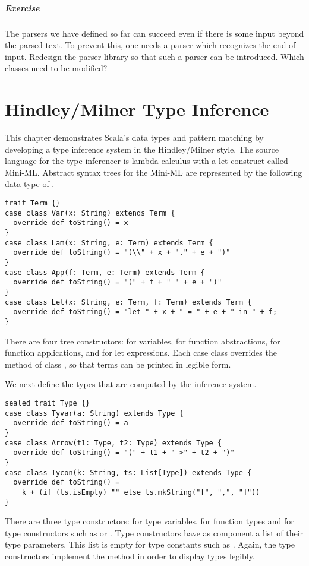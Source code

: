 \documentclass[a4paper,12pt,twoside,titlepage]{book}
\newcommand{\exercise}{\paragraph{Exercise}}
\begin{document}
{\exercise\label{exercise:end-marker} The parsers we have defined so
far can succeed even if there is some input beyond the parsed text. To
prevent this, one needs a parser which recognizes the end of input.
Redesign the parser library so that such a parser can be introduced.
Which classes need to be modified?

\chapter{\label{sec:hm}Hindley/Milner Type Inference}

This chapter demonstrates Scala's data types and pattern matching by
developing a type inference system in the Hindley/Milner style. The
source language for the type inferencer is lambda calculus with a let
construct called Mini-ML. Abstract syntax trees for the Mini-ML are
represented by the following data type of .
\begin{lstlisting}
trait Term {}
case class Var(x: String) extends Term {
  override def toString() = x
}
case class Lam(x: String, e: Term) extends Term {
  override def toString() = "(\\" + x + "." + e + ")"
}
case class App(f: Term, e: Term) extends Term {
  override def toString() = "(" + f + " " + e + ")"
}
case class Let(x: String, e: Term, f: Term) extends Term {
  override def toString() = "let " + x + " = " + e + " in " + f;
}
\end{lstlisting}
There are four tree constructors:  for variables, 
for function abstractions,  for function applications, and
 for let expressions. Each case class overrides the
 method of class , so that terms can be
printed in legible form.

We next define the types that are
computed by the inference system.
\begin{lstlisting}
sealed trait Type {}
case class Tyvar(a: String) extends Type {
  override def toString() = a
}
case class Arrow(t1: Type, t2: Type) extends Type {
  override def toString() = "(" + t1 + "->" + t2 + ")"
}
case class Tycon(k: String, ts: List[Type]) extends Type {
  override def toString() = 
    k + (if (ts.isEmpty) "" else ts.mkString("[", ",", "]"))
}
\end{lstlisting}
There are three type constructors:  for type variables,
 for function types and  for type constructors
such as  or . Type constructors have as
component a list of their type parameters. This list is empty for type
constants such as . Again, the type constructors
implement the  method in order to display types legibly.

}
\end{document}
